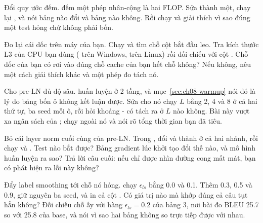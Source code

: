 \begin{bt}
  \item Đổi quy ước đếm.  đếm một phép nhân-cộng là hai FLOP. Sửa
    thành một, chạy lại , và nói bảng nào đổi và bảng nào
    không. Rồi chạy  và giải thích
    vì sao đúng một test hỏng chứ không phải bốn.

  \item Đo lại cái dốc trên máy của bạn. Chạy  và tìm chỗ
    cột  bắt đầu leo. Tra kích thước L3 của CPU bạn dùng
    ( trên Windows,  trên Linux) rồi
    đối chiếu với cột . Chỗ dốc của bạn có rơi vào đúng chỗ
    cache của bạn hết chỗ không? Nếu không, nêu một cách giải thích khác và một
    phép đo tách nó.

  \item Cho pre-LN đủ độ sâu.  huấn luyện ở 2 tầng, và
    mục~\ref{sec:ch08-warmup} nói đó là lý do bảng bốn ô không kết luận được.
    Sửa cho nó chạy \(L\) bằng 2, 4 và 8 ở cả hai thứ tự, ba seed mỗi ô, rồi hỏi
    khoảng - có tách ra ở \(L\) nào không. Bài này vượt xa
    ngân sách của ; chạy ngoài nó và nói rõ tổng thời gian bạn
    đã tiêu.

  \item Bỏ cái layer norm cuối cùng của pre-LN. Trong ,
    đổi  và  thành 
    ở cả hai nhánh, rồi chạy  và
    . Test nào bắt được? Bảng gradient lúc khởi tạo đổi thế
    nào, và mô hình huấn luyện ra sao? Trả lời câu cuối: nếu chỉ được nhìn
    đường cong mất mát, bạn có phát hiện ra lỗi này không?

  \item Đẩy label smoothing tới chỗ nó hỏng.  chạy
    \(\epsilon_{ls}\) bằng 0.0 và 0.1. Thêm 0.3, 0.5 và 0.9, giữ nguyên ba seed,
    và in cả cột . Có giá trị nào mà khớp đúng cả câu tụt hẳn
    không? Đối chiếu chỗ ấy với hàng \(\epsilon_{ls} = 0.2\) của bảng 3, nơi bài
    đo BLEU 25.7 so với 25.8 của base, và nói vì sao hai bảng không so trực tiếp
    được với nhau.
\end{bt}

\tierextend

